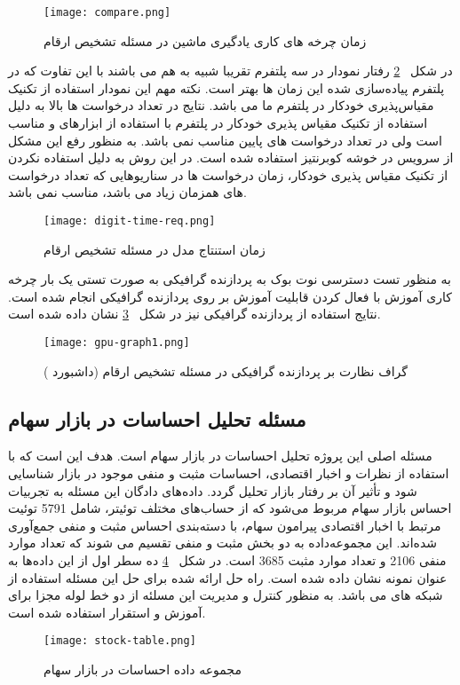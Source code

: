 \begin{figure}[t]
	\centering
	\texttt{[image: compare.png]}
	\caption{زمان چرخه های کاری یادگیری ماشین در مسئله تشخیص ارقام}
	\label{fig: digit times}
\end{figure}

در شکل ~\ref{fig: digit time request} رفتار نمودار در سه پلتفرم تقریبا شبیه به هم می باشند با این تفاوت که در پلتفرم پیاده‌سازی شده این زمان ها بهتر است. نکته مهم این نمودار استفاده از تکنیک مقیاس‌پذیری خودکار در پلتفرم ما می باشد. نتایج در تعداد درخواست ها بالا به دلیل استفاده از تکنیک مقیاس پذیری خودکار در پلتفرم با استفاده از ابزارهای  و  مناسب است ولی در تعداد درخواست های پایین مناسب نمی باشد. به منظور رفع این مشکل از سرویس  در خوشه کوبرنتیز استفاده شده است. در این روش به دلیل استفاده نکردن از تکنیک مقیاس پذیری خودکار،‌ زمان درخواست ها در سناریوهایی که تعداد درخواست های همزمان زیاد می باشد، مناسب نمی باشد.

\begin{figure}[!t]
	\centering
	\texttt{[image: digit-time-req.png]}
	\caption{زمان استنتاج مدل در مسئله تشخیص ارقام}
	\label{fig: digit time request}
\end{figure}

به منظور تست دسترسی نوت بوک به پردازنده گرافیکی به صورت تستی یک بار چرخه کاری آموزش با فعال کردن قابلیت آموزش بر روی پردازنده گرافیکی انجام شده است. نتایج استفاده از پردازنده گرافیکی نیز در شکل 
~\ref{fig: gpu graph}
نشان داده شده است.
\begin{figure}[!t]
	\centering
	\texttt{[image: gpu-graph1.png]}
	\caption{گراف نظارت بر پردازنده گرافیکی در مسئله تشخیص ارقام (داشبورد )}
	\label{fig: gpu graph}
\end{figure}


\subsection{مسئله تحلیل احساسات در بازار سهام}

مسئله اصلی این پروژه تحلیل احساسات در بازار سهام است. هدف این است که با استفاده از نظرات و اخبار اقتصادی، احساسات مثبت و منفی موجود در بازار شناسایی شود و تأثیر آن بر رفتار بازار تحلیل گردد. داده‌های دادگان این مسئله به تجربیات احساس بازار سهام مربوط می‌شود  که از حساب‌های مختلف توئیتر، شامل 5791 توئیت مرتبط با اخبار اقتصادی پیرامون سهام، با دسته‌بندی احساس مثبت و منفی جمع‌آوری شده‌اند. این مجموعه‌داده به دو بخش مثبت و منفی تقسیم می شوند که تعداد موارد منفی 2106 و تعداد موارد مثبت 3685 است. در شکل 
~\ref{fig: stock data}
 ده سطر اول از این داده‌ها به عنوان نمونه نشان داده شده است. راه حل ارائه شده برای حل این مسئله استفاده از شبکه های  می باشد. به منظور کنترل و مدیریت این مسلئه از دو خط لوله مجزا برای آموزش و استقرار استفاده شده است. 
\begin{figure}[!b]
	\centering
	\texttt{[image: stock-table.png]}
	\caption{مجموعه داده احساسات در بازار سهام}
	\label{fig: stock data}
\end{figure}

